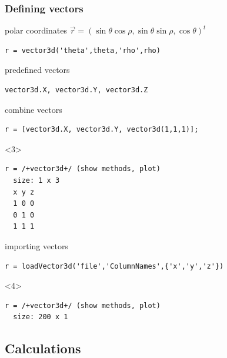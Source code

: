 \documentclass[compress]{beamer}
\begin{document}
\begin{frame}
  \frametitle{Defining vectors}

  \begin{overlayarea}{\textwidth}{8cm}

    polar coordinates $\vec r = (\sin \theta \cos \rho,\sin \theta \sin \rho,\cos \theta)^{t}$

\begin{lstlisting}[style=input]
r = vector3d('theta',theta,'rho',rho)
\end{lstlisting}

  \pause \medskip

  predefined vectors
\begin{lstlisting}[style=input]
vector3d.X, vector3d.Y, vector3d.Z
\end{lstlisting}

  \pause \medskip

  combine vectors
\begin{lstlisting}[style=input]
r = [vector3d.X, vector3d.Y, vector3d(1,1,1)];
\end{lstlisting}

\begin{onlyenv}<3>
  \vspace{-.3cm}
\begin{lstlisting}[style=output]
r = /+vector3d+/ (show methods, plot)
  size: 1 x 3
  x y z
  1 0 0
  0 1 0
  1 1 1
\end{lstlisting}
\end{onlyenv}
  \pause \medskip

  importing vectors
\begin{lstlisting}[style=input]
r = loadVector3d('file','ColumnNames',{'x','y','z'})
\end{lstlisting}
\begin{onlyenv}<4>
  \vspace{-.3cm}
\begin{lstlisting}[style=output]
r = /+vector3d+/ (show methods, plot)
  size: 200 x 1
\end{lstlisting}
\end{onlyenv}

\end{overlayarea}
\end{frame}

\subsection*{Calculations}
\end{document}
